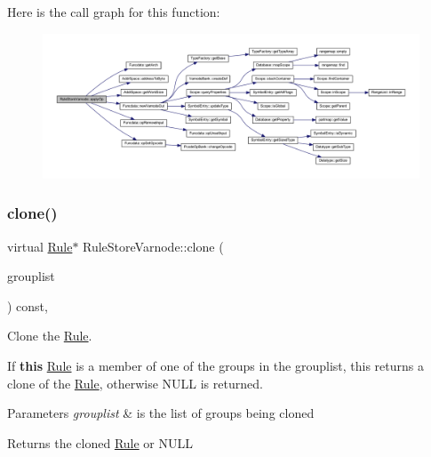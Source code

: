 Here is the call graph for this function\+:
\nopagebreak
\begin{figure}[H]
\begin{center}
\leavevmode
\includegraphics[width=350pt]{class_rule_store_varnode_af2356cc3335eab5bc75ff0d8f5223165_cgraph}
\end{center}
\end{figure}
\mbox{\label{class_rule_store_varnode_a8791c49e017c00b88b6d449050762b43}} 
\subsubsection{\texorpdfstring{clone()}{clone()}}
{\footnotesize\ttfamily virtual \mbox{\hyperlink{class_rule}{Rule}}$\ast$ Rule\+Store\+Varnode\+::clone (\begin{DoxyParamCaption}\item[{const \mbox{\hyperlink{class_action_group_list}{Action\+Group\+List}} \&}]{grouplist }\end{DoxyParamCaption}) const\hspace{0.3cm}{\ttfamily [inline]}, {\ttfamily [virtual]}}



Clone the \mbox{\hyperlink{class_rule}{Rule}}. 

If {\bfseries{this}} \mbox{\hyperlink{class_rule}{Rule}} is a member of one of the groups in the grouplist, this returns a clone of the \mbox{\hyperlink{class_rule}{Rule}}, otherwise N\+U\+LL is returned. 
\begin{DoxyParams}{Parameters}
{\em grouplist} & is the list of groups being cloned \\
\hline
\end{DoxyParams}
\begin{DoxyReturn}{Returns}
the cloned \mbox{\hyperlink{class_rule}{Rule}} or N\+U\+LL 
\end{DoxyReturn}



